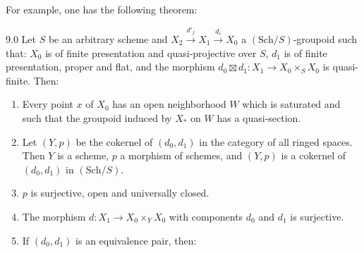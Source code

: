 For example, one has the following theorem:
\begin{theorem}{9.0}\label{V.9.0}
Let $S$ be an arbitrary scheme and $X_2\xrightarrow{d'_j}X_1\xrightarrow{d_i}X_0$ a $(\mathrm{Sch}/S)$-groupoid such that: $X_0$ is of finite presentation and quasi-projective over $S$, $d_1$ is of finite presentation, proper and flat, and the morphism $d_0\boxtimes d_1:X_1\to X_0\times_SX_0$ is quasi-finite. Then:
\begin{enumerate}[label=\textup{(\arabic*)}]
\item Every point $x$ of $X_0$ has an open neighborhood $W$ which is saturated and such that the groupoid induced by $X_*$ on $W$ has a quasi-section.
\item Let $(Y,p)$ be the cokernel of $(d_0,d_1)$ in the category of all ringed spaces. Then $Y$ is a scheme, $p$ a morphism of schemes, and $(Y,p)$ is a cokernel of $(d_0,d_1)$ in $(\mathrm{Sch}/S)$.
\item $p$ is surjective, open and universally closed.
\item The morphism $d:X_1\to X_0\times_YX_0$ with components $d_0$ and $d_1$ is surjective.
\item If $(d_0,d_1)$ is an equivalence pair, then:
\end{enumerate}
\end{theorem}
